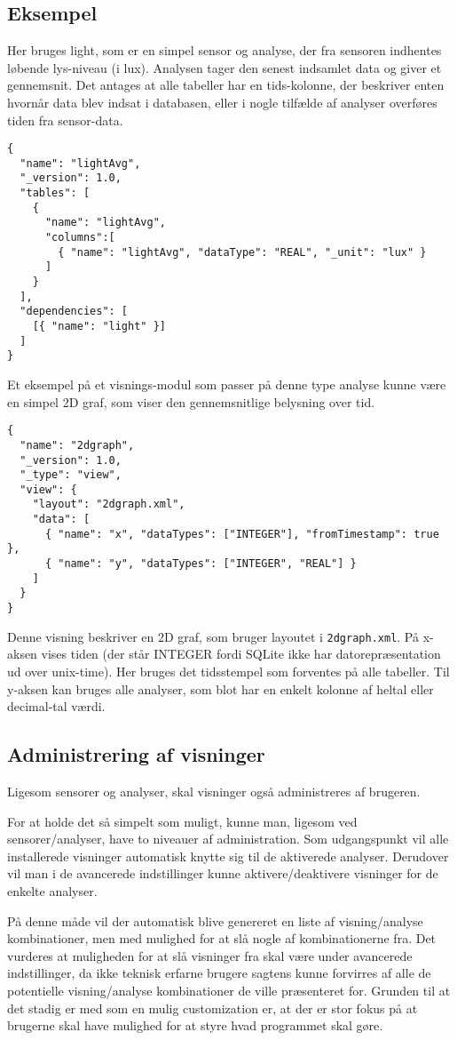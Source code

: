 \subsection{Eksempel}
Her bruges light, som er en simpel sensor og analyse, der fra sensoren indhentes løbende lys-niveau (i lux).
Analysen tager den senest indsamlet data og giver et gennemsnit.
Det antages at alle tabeller har en tids-kolonne, der beskriver enten hvornår data blev indsat i databasen, eller i nogle tilfælde af analyser overføres tiden fra sensor-data.

\begin{lstlisting}
{
  "name": "lightAvg",
  "_version": 1.0,
  "tables": [
    {
      "name": "lightAvg",
      "columns":[
        { "name": "lightAvg", "dataType": "REAL", "_unit": "lux" }
      ]
    }
  ],
  "dependencies": [
    [{ "name": "light" }]
  ]
}
\end{lstlisting}

Et eksempel på et visnings-modul som passer på denne type analyse kunne være en simpel 2D graf, som viser den gennemsnitlige belysning over tid.

\begin{lstlisting}
{
  "name": "2dgraph",
  "_version": 1.0,
  "_type": "view",
  "view": {
    "layout": "2dgraph.xml",
    "data": [
      { "name": "x", "dataTypes": ["INTEGER"], "fromTimestamp": true },
      { "name": "y", "dataTypes": ["INTEGER", "REAL"] }
    ]
  }
}
\end{lstlisting}
 
Denne visning beskriver en 2D graf, som bruger layoutet i \texttt{2dgraph.xml}.
På x-aksen vises tiden (der står INTEGER fordi SQLite ikke har datorepræsentation ud over unix-time).
Her bruges det tidsstempel som forventes på alle tabeller.
Til y-aksen kan bruges alle analyser, som blot har en enkelt kolonne af heltal eller decimal-tal værdi.

\subsection{Administrering af visninger}
Ligesom sensorer og analyser, skal visninger også administreres af brugeren.

For at holde det så simpelt som muligt, kunne man, ligesom ved sensorer/analyser, have to niveauer af administration.
Som udgangspunkt vil alle installerede visninger automatisk knytte sig til de aktiverede analyser.
Derudover vil man i de avancerede indstillinger kunne aktivere/deaktivere visninger for de enkelte analyser.

På denne måde vil der automatisk blive genereret en liste af visning/analyse kombinationer, men med mulighed for at slå nogle af kombinationerne fra.
Det vurderes at muligheden for at slå visninger fra skal være under avancerede indstillinger, da ikke teknisk erfarne brugere sagtens kunne forvirres af alle de potentielle visning/analyse kombinationer de ville præsenteret for.
Grunden til at det stadig er med som en mulig customization er, at der er stor fokus på at brugerne skal have mulighed for at styre hvad programmet skal gøre. 
